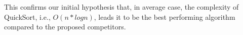\documentclass{article}
\begin{document}
    This confirms our initial hypothesis that, in average case, the complexity of QuickSort, i.e., $O(n*logn)$, leads it to be the best performing algorithm compared to the proposed competitors.
    



\end{document}

